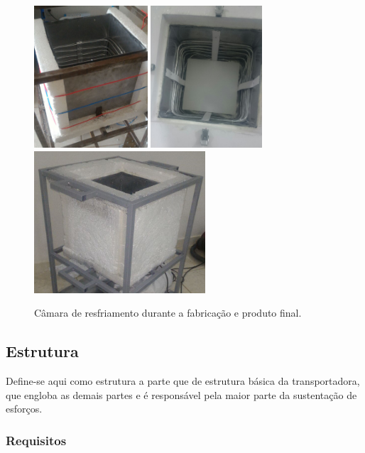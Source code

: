 \begin{figure}[H]
	\centering
	\includegraphics[height=150pt]{figuras/caixaext1.png}
	\includegraphics[height=150pt]{figuras/caixaext3.png}
	\includegraphics[height=150pt]{figuras/caixaext2.png}
	\caption{Câmara de resfriamento durante a fabricação e produto final.}
\end{figure}


\subsection{Estrutura}

Define-se aqui como estrutura a parte que de estrutura básica da transportadora, que engloba as demais partes e é responsável pela maior parte da sustentação de esforços.

\subsubsection{Requisitos}

